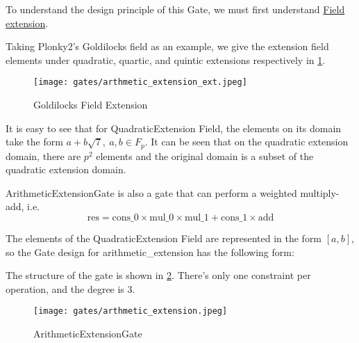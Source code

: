 
\hspace*{\fill}

\indent To understand the design principle of this Gate, we must first understand \href{https://en.wikipedia.org/wiki/Field_extension#Extension_field}{Field extension}. 

Taking Plonky2's Goldilocks field as an example, we give the extension field elements under quadratic, quartic, and quintic extensions respectively in \ref{fig:goldilocks field extension}.

\begin{figure}[!ht]
    \centering
    \texttt{[image: gates/arthmetic\_extension\_ext.jpeg]}
    \caption{Goldilocks Field Extension}
    \label{fig:goldilocks field extension}
\end{figure}

It is easy to see that for QuadraticExtension Field, the elements on its domain take the form $a+b\sqrt{7}, \ a,b \in F_p$.
It can be seen that on the quadratic extension domain, there are $p^2$ elements and the original domain is a subset of the quadratic extension domain.

ArithmeticExtensionGate is also a gate that can perform a weighted multiply-add, i.e.
\[ \text{res} = \text{cons\_0} \times \text{mul\_0} \times \text{mul\_1} + \text{cons\_1} \times \text{add} \]

The elements of the QuadraticExtension Field are represented in the form $[a, b]$, so the Gate design for arithmetic\_extension has the following form:

The structure of the gate is shown in \ref{fig:arthmetic-extension}. There's only one constraint per operation, and the degree is 3.
\begin{figure}[!ht]
    \centering
    \texttt{[image: gates/arthmetic\_extension.jpeg]}
    \caption{ArithmeticExtensionGate}
    \label{fig:arthmetic-extension}
\end{figure}
